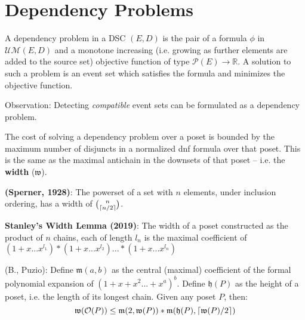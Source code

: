 \documentclass{beamer}
\newcommand{\UMc}{\mathcal{UM}}
\newcommand{\Oc}{\mathcal{O}}
\newcommand{\Pc}{\mathcal{P}}
\newcommand{\Mf}{\mathfrak{m}}
\newcommand{\Wf}{\mathfrak{w}}
\newcommand{\Hf}{\mathfrak{h}}
\DeclarePairedDelimiter\ceil{\lceil}{\rceil}
\begin{document}
\section{Dependency Problems}
\begin{frame}
\begin{definition}
A dependency problem in a DSC \((E,D)\) is the pair of a formula \(\phi\) in \(\UMc(E,D)\) and a monotone increasing (i.e. growing as further elements are added to the source set) objective function of type \(\Pc(E) \rightarrow \mathbb{R}\). A solution to such a problem is an event set which satisfies the formula and minimizes the objective function.
\end{definition}

Observation: Detecting \textit{compatible} event sets can be formulated as a dependency problem.
\end{frame}

\begin{frame}
The cost of solving a dependency problem over a poset is bounded by the maximum number of disjuncts in a normalized dnf formula over that poset. This is the same as the maximal antichain in the downsets of that poset -- i.e. the \textbf{width} (\(\Wf\)).

\begin{theorem}
\textbf{(Sperner, 1928)}: The powerset of a set with \(n\) elements, under inclusion ordering, has a width of \(\binom{n}{\ceil{n/2}}\).
\end{theorem}
\end{frame}

\begin{frame}

\begin{lemma}
\textbf{Stanley's Width Lemma (2019)}: The width of a poset constructed as the product of \(n\) chains, each of length \(l_n\) is the maximal coefficient of \((1+x...x^{l_1})*(1+x...x^{l_2})...*(1+x...x^{l_n})\)
\end{lemma}

\begin{theorem}
(B., Puzio): Define \(\Mf(a,b)\) as the central (maximal) coefficient of the formal polynomial expansion of \((1 + x + x^2 ... + x^a)^b\). Define \(\Hf(P)\) as the height of a poset, i.e. the length of its longest chain. Given any poset \(P\), then:
\begin{equation*}
 \Wf(\Oc(P)) \le \Mf(2,\Wf(P)) * \Mf(\Hf(P),\ceil{\Wf(P)/2})
\end{equation*}
\end{theorem}
\end{frame}
\end{document}
